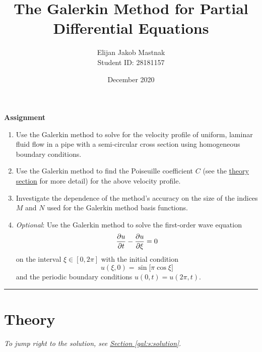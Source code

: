\documentclass[11pt, a4paper]{article}
\newcommand{\Pois}{Poiseuille\xspace}  %
\begin{document}
\title{The Galerkin Method for Partial Differential Equations}
\author{Elijan Jakob Mastnak\\[1mm]\small{Student ID: 28181157}}
\date{December 2020}
\maketitle

\tableofcontents

\newpage
\begin{center}
\textbf{Assignment}
\begin{enumerate}
	\item Use the Galerkin method to solve for the velocity profile of uniform, laminar fluid flow in a pipe with a semi-circular cross section using homogeneous boundary conditions.
	
	\item Use the Galerkin method to find the \Pois coefficient $ C $ (see the \hyperref[gal:s:theory]{theory section} for more detail) for the above velocity profile.
	
	\item Investigate the dependence of the method's accuracy on the size of the indices $ M $ and $ N $ used for the Galerkin method basis functions.
	
	\item \textit{Optional}: Use the Galerkin method to solve the first-order wave equation 
	\begin{equation*}
		\pdv{u}{t} - \pdv{u}{\xi} = 0
	\end{equation*}
	on the interval $ \xi \in [0, 2\pi] $ with the initial condition
	\begin{equation*}
		u(\xi, 0) = \sin\big[\pi \cos \xi \big]
	\end{equation*}
	and the periodic boundary conditions $ u(0, t) = u(2\pi, t) $.
\end{enumerate}
\end{center}

\vspace{2mm}

\rule{\textwidth}{0.2pt}

\section{Theory} \label{gal:s:theory}
\vspace{-2mm}
\textit{To jump right to the solution, see \hyperref[gal:s:solution]{Section \ref{gal:s:solution}}}.
\vspace{2mm}
\end{document}
